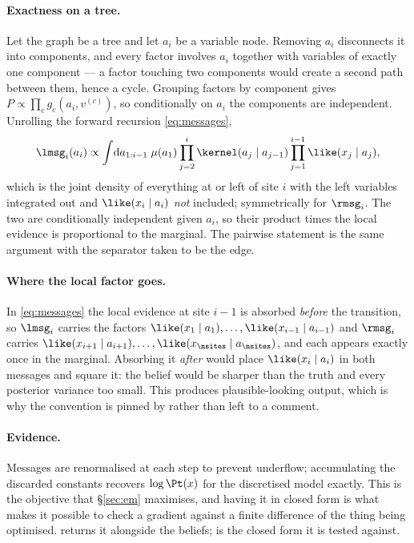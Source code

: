 \paragraph{Exactness on a tree.} Let the graph be a tree and let $a_i$ be a variable node.
Removing $a_i$ disconnects it into components, and every factor involves $a_i$ together with
variables of exactly one component --- a factor touching two components would create a second
path between them, hence a cycle. Grouping factors by component gives
$P \propto \prod_c g_c(a_i, v^{(c)})$, so conditionally on $a_i$ the components are independent.
Unrolling the forward recursion \eqref{eq:messages},
\[
\lmsg_i(a_i) \propto \int\!\mathrm{d}a_{1:i-1}\;
\mu(a_1)\prod_{j=2}^{i}\kernel(a_j\mid a_{j-1})\prod_{j=1}^{i-1}\like(x_j\mid a_j),
\]
which is the joint density of everything at or left of site $i$ with the left variables
integrated out and $\like(x_i\mid a_i)$ \emph{not} included; symmetrically for $\rmsg_i$. The two
are conditionally independent given $a_i$, so their product times the local evidence is
proportional to the marginal. The pairwise statement is the same argument with the separator
taken to be the edge.

\paragraph{Where the local factor goes.} In \eqref{eq:messages} the local evidence at site $i-1$
is absorbed \emph{before} the transition, so $\lmsg_i$ carries the factors
$\like(x_1\mid a_1),\dots,\like(x_{i-1}\mid a_{i-1})$ and $\rmsg_i$ carries
$\like(x_{i+1}\mid a_{i+1}),\dots,\like(x_{\nsites}\mid a_{\nsites})$, and each appears exactly
once in the marginal. Absorbing it \emph{after} would place $\like(x_i\mid a_i)$ in both
messages and square it: the
belief would be sharper than the truth and every posterior variance too small. This produces
plausible-looking output, which is why the convention is pinned by
 rather than left to a comment.

\paragraph{Evidence.} Messages are renormalised at each step to prevent underflow; accumulating
the discarded constants recovers $\log\Pt(x)$ for the discretised model exactly. This is the
objective that \S\ref{sec:em} maximises, and having it in closed form is what makes it possible
to check a gradient against a finite difference of the thing being optimised.
 returns it alongside the beliefs;
 is the closed form it is tested against.

